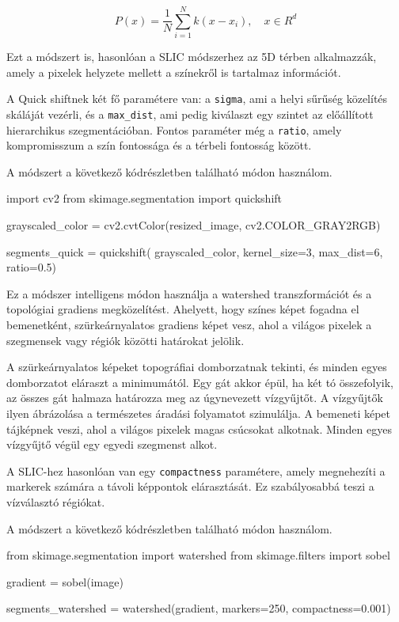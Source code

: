 \[ P(x) =\frac{1}{N} \sum_{i=1}^{N} k(x-x_i), \quad x \in R^d \]

Ezt a módszert is, hasonlóan a SLIC módszerhez az 5D térben alkalmazzák, amely a pixelek helyzete mellett a színekről is tartalmaz információt.

A Quick shiftnek két fő paramétere van: a \texttt{sigma}, ami a helyi sűrűség közelítés skáláját vezérli, és a \texttt{max\_dist}, ami pedig kiválaszt egy szintet az előállított hierarchikus szegmentációban. Fontos paraméter még a \texttt{ratio}, amely kompromisszum a szín fontossága és a térbeli fontosság között. \cite{superpixel} \cite{superpixel_example}

A módszert a következő kódrészletben található módon használom.
\begin{python}
import cv2
from skimage.segmentation import quickshift

grayscaled_color = cv2.cvtColor(resized_image, cv2.COLOR_GRAY2RGB)

segments_quick = quickshift(
    grayscaled_color,
    kernel_size=3,
    max_dist=6,
    ratio=0.5)
\end{python}


Ez a módszer intelligens módon használja a watershed transzformációt és a topológiai gradiens megközelítést. Ahelyett, hogy színes képet fogadna el bemenetként, szürkeárnyalatos gradiens képet vesz, ahol a világos pixelek a szegmensek vagy régiók közötti határokat jelölik.

A szürkeárnyalatos képeket topográfiai domborzatnak tekinti, és minden egyes domborzatot eláraszt a minimumától. Egy gát akkor épül, ha két tó összefolyik, az összes gát halmaza határozza meg az úgynevezett vízgyűjtőt. A vízgyűjtők ilyen ábrázolása a természetes áradási folyamatot szimulálja. A bemeneti képet tájképnek veszi, ahol a világos pixelek magas csúcsokat alkotnak. Minden egyes vízgyűjtő végül egy egyedi szegmenst alkot.

A SLIC-hez hasonlóan van egy \texttt{compactness} paramétere, amely megnehezíti a markerek számára a távoli képpontok elárasztását. Ez szabályosabbá teszi a vízválasztó régiókat. \cite{superpixel} \cite{superpixel_example}

A módszert a következő kódrészletben található módon használom.
\begin{python}
from skimage.segmentation import watershed
from skimage.filters import sobel

gradient = sobel(image)

segments_watershed = watershed(gradient, markers=250, compactness=0.001)
\end{python}


